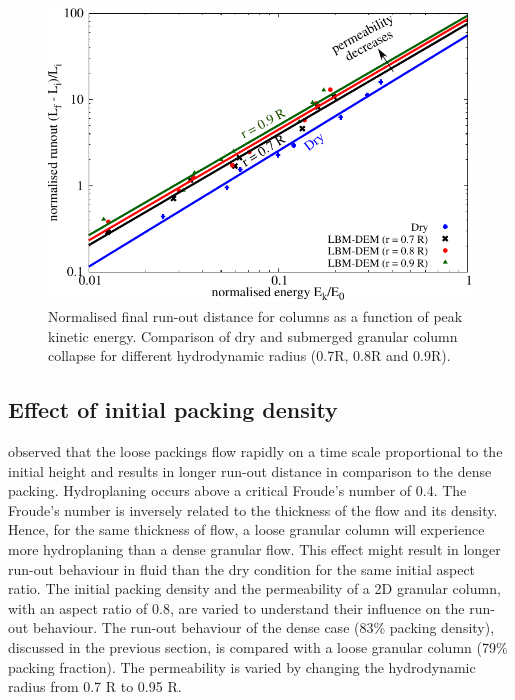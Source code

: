 \begin{landscape}
\begin{figure}
	\centering
	\includegraphics[height=0.9\textheight]{runout_fluid_dry_energy}
	\caption{Normalised final run-out distance for columns as a function of 
	peak kinetic energy. Comparison of dry and submerged granular column 
	collapse for different hydrodynamic radius (0.7R, 0.8R and 0.9R).}
	\label{fig:runout_fluid_dry_energy}
\end{figure}
\end{landscape}



\subsection{Effect of initial packing density}

\citet{Rondon2011} observed that the loose packings flow rapidly on a time
scale proportional to the initial height and results in longer run-out distance 
in comparison to the dense packing. Hydroplaning occurs above a critical 
Froude's number of 0.4. The Froude's number is inversely related to the 
thickness of the flow and its density. Hence, for the same thickness of flow, a 
loose granular column will experience more hydroplaning than a dense granular 
flow. This effect might result in longer run-out behaviour in fluid than the 
dry condition for the same initial aspect ratio. The initial packing density 
and the permeability of a 2D granular column, with an aspect ratio of 0.8, are 
varied to understand their influence on the run-out behaviour. The run-out 
behaviour of the dense case (83\% packing density), discussed in the previous 
section, is compared with a loose granular column (79\% packing fraction). The 
permeability is varied by changing the hydrodynamic radius from 0.7 R to 0.95 
R. 

